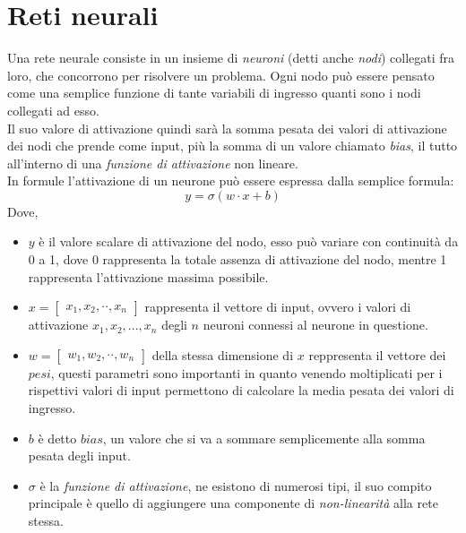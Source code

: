 \documentclass[12pt,a4paper,openright,twoside]{report}
\begin{document}
\section{Reti neurali}
Una rete neurale consiste in un insieme di \emph{neuroni} (detti anche \emph{nodi}) collegati fra loro, che concorrono per risolvere un problema.
Ogni nodo può essere pensato come una semplice funzione di tante variabili di ingresso quanti sono i nodi collegati ad esso. \\
Il suo valore di attivazione quindi sarà la somma pesata dei valori di attivazione dei nodi che prende come input, più la somma di un valore chiamato \emph{bias}, il tutto all’interno di una \emph{funzione di attivazione} non lineare. \\
In formule l’attivazione di un neurone può essere espressa dalla semplice formula: \\
\begin{equation}
    y = \sigma(w \cdot x + b)
\end{equation}
Dove, \\
\begin{itemize}
    \item 
        $y$ è il valore scalare di attivazione del nodo, esso può variare con continuità da 0 a 1, dove 0 rappresenta la totale assenza di attivazione del nodo, mentre 1 rappresenta l'attivazione massima possibile. 
    \item 
        $ x= \begin{bmatrix} x_1 , x_2 , \cdot\cdot , x_n\end{bmatrix} $ rappresenta il vettore di input, ovvero i valori di attivazione $x_1, x_2, ... , x_n$ degli $n$ neuroni connessi al neurone in questione.
    \item 
        $ w= \begin{bmatrix} w_1 , w_2 , \cdot\cdot , w_n\end{bmatrix} $ della stessa dimensione di $x$
        reppresenta il vettore dei $pesi$, questi parametri sono importanti in quanto venendo moltiplicati per i rispettivi valori di input permettono di calcolare la media pesata dei valori di ingresso.
    \item 
        $b$ è detto $bias$, un valore che si va a sommare semplicemente alla somma pesata degli input.
    \item 
        $\sigma$ è la \emph{funzione di attivazione}, ne esistono di numerosi tipi, il suo compito principale è quello di aggiungere una componente di \emph{non-linearità} alla rete stessa. 

\end{itemize}
\end{document}
